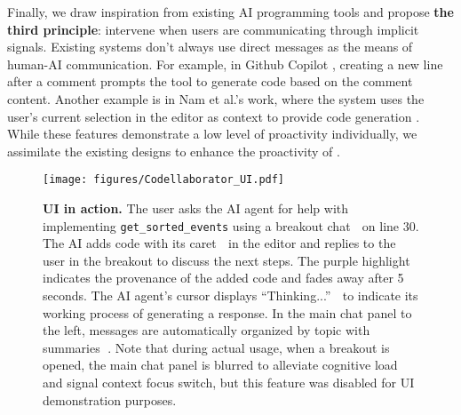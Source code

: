 Finally, we draw inspiration from existing AI programming tools \cite{githubcopilot, copilotX, Nam2023InIDEGI} and propose \textbf{the third principle}: intervene when users are communicating through implicit signals.
Existing systems don't always use direct messages as the means of human-AI communication.
For example, in Github Copilot \cite{githubcopilot}, creating a new line after a comment prompts the tool to generate code based on the comment content. 
Another example is in Nam et al.'s work, where the system uses the user's current selection in the editor as context to provide code generation \cite{Nam2023InIDEGI}.
While these features demonstrate a low level of proactivity individually, we assimilate the existing designs to enhance the proactivity of \sys{}.



\begin{figure*}[t]
    \centering
    \texttt{[image: figures/Codellaborator\_UI.pdf]}
    \caption{\textbf{\sys{} UI in action.} \textnormal{The user asks the AI agent for help with implementing \texttt{get\_sorted\_events} using a breakout chat \textcircled{\raisebox{-0.5pt}{a}} on line 30. The AI adds code with its caret \textcircled{\raisebox{-0.5pt}{b}} in the editor and replies to the user in the breakout to discuss the next steps. The purple highlight  \textcircled{\raisebox{-0.5pt}{c}} indicates the provenance of the added code and fades away after 5 seconds. The AI agent's cursor displays ``Thinking...'' \textcircled{\raisebox{-0.5pt}{d}} to indicate its working process of generating a response. In the main chat panel to the left, messages are automatically organized by topic with summaries \textcircled{\raisebox{-0.5pt}{e}}. Note that during actual usage, when a breakout is opened, the main chat panel is blurred to alleviate cognitive load and signal context focus switch, but this feature was disabled for UI demonstration purposes.}}
    \label{fig:ui}
\end{figure*}

